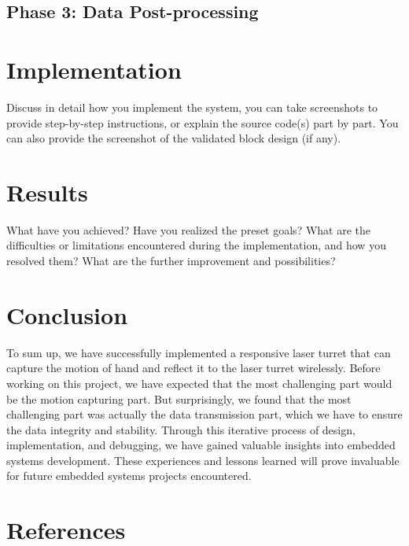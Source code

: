 \documentclass[12pt, a4paper]{article}
\begin{document}
\subsection{Phase 3: Data Post-processing}


\section{Implementation}
Discuss in detail how you implement the system, you can take
screenshots to provide step-by-step instructions, or explain the source
code(s) part by part. You can also provide the screenshot of the
validated block design (if any).

\section{Results}
What have you achieved? Have you realized the preset goals?
What are the difficulties or limitations encountered during the
implementation, and how you resolved them?
What are the further improvement and possibilities?

\section{Conclusion}
To sum up, we have successfully implemented a responsive laser turret that can capture the motion of hand and reflect it to the laser turret wirelessly.
\newline
Before working on this project, we have expected that the most challenging part would be the motion capturing part. 
But surprisingly, we found that the most challenging part was actually the data transmission part, which we have to ensure the data integrity and stability.
Through this iterative process of design, implementation, and debugging, we have gained valuable insights into embedded systems development. 
These experiences and lessons learned will prove invaluable for future embedded systems projects encountered.

\section{References}
\printbibliography[heading=none]
\end{document}
